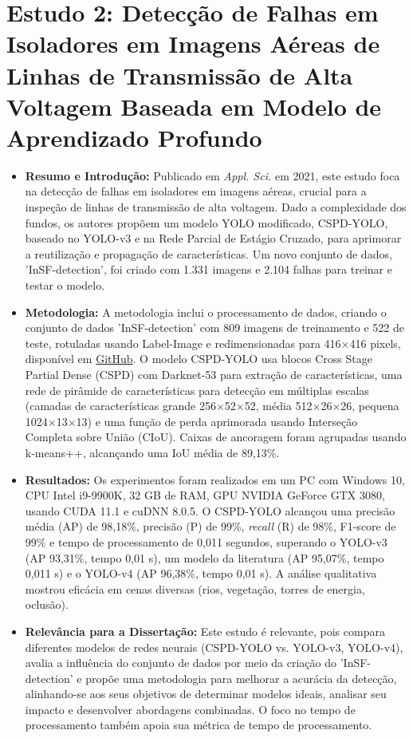 \section{Estudo 2: Detecção de Falhas em Isoladores em Imagens Aéreas de Linhas de Transmissão de Alta Voltagem Baseada em Modelo de Aprendizado Profundo}
\begin{itemize}
    \item \textbf{Resumo e Introdução:} Publicado em \textit{Appl. Sci.} em 2021, este estudo foca na detecção de falhas em isoladores em imagens aéreas, crucial para a inspeção de linhas de transmissão de alta voltagem. Dado a complexidade dos fundos, os autores propõem um modelo YOLO modificado, CSPD-YOLO, baseado no YOLO-v3 e na Rede Parcial de Estágio Cruzado, para aprimorar a reutilização e propagação de características. Um novo conjunto de dados, 'InSF-detection', foi criado com 1.331 imagens e 2.104 falhas para treinar e testar o modelo.
    \item \textbf{Metodologia:} A metodologia inclui o processamento de dados, criando o conjunto de dados 'InSF-detection' com 809 imagens de treinamento e 522 de teste, rotuladas usando Label-Image e redimensionadas para 416$\times$416 pixels, disponível em \href{https://github.com/InsulatorData/InsulatorDataSet}{GitHub}. O modelo CSPD-YOLO usa blocos Cross Stage Partial Dense (CSPD) com Darknet-53 para extração de características, uma rede de pirâmide de características para detecção em múltiplas escalas (camadas de características grande 256$\times$52$\times$52, média 512$\times$26$\times$26, pequena 1024$\times$13$\times$13) e uma função de perda aprimorada usando Interseção Completa sobre União (CIoU). Caixas de ancoragem foram agrupadas usando k-means++, alcançando uma IoU média de 89,13\%.
    \item \textbf{Resultados:} Os experimentos foram realizados em um PC com Windows 10, CPU Intel i9-9900K, 32 GB de RAM, GPU NVIDIA GeForce GTX 3080, usando CUDA 11.1 e cuDNN 8.0.5. O CSPD-YOLO alcançou uma precisão média (AP) de 98,18\%, precisão (P) de 99\%, \textit{recall} (R) de 98\%, F1-score de 99\% e tempo de processamento de 0,011 segundos, superando o YOLO-v3 (AP 93,31\%, tempo 0,01 s), um modelo da literatura (AP 95,07\%, tempo 0,011 s) e o YOLO-v4 (AP 96,38\%, tempo 0,01 s). A análise qualitativa mostrou eficácia em cenas diversas (rios, vegetação, torres de energia, oclusão).
    \item \textbf{Relevância para a Dissertação:} Este estudo é relevante, pois compara diferentes modelos de redes neurais (CSPD-YOLO vs. YOLO-v3, YOLO-v4), avalia a influência do conjunto de dados por meio da criação do 'InSF-detection' e propõe uma metodologia para melhorar a acurácia da detecção, alinhando-se aos seus objetivos de determinar modelos ideais, analisar seu impacto e desenvolver abordagens combinadas. O foco no tempo de processamento também apoia sua métrica de tempo de processamento.
\end{itemize}


